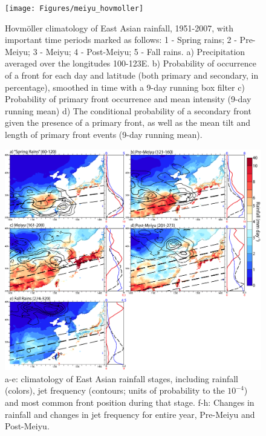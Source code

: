 \documentclass[draft,grl]{AGUTeX}
\begin{document}
\begin{figure}
\label{hov}
\noindent\texttt{[image: Figures/meiyu\_hovmoller]}
\caption{Hovm\"oller climatology of East Asian rainfall, 1951-2007, with important time periods marked as follows: 1 - Spring rains; 2 - Pre-Meiyu; 3 - Meiyu; 4 - Post-Meiyu; 5 - Fall rains. a) Precipitation averaged over the longitudes 100-123\textdegree E. b) Probability of occurrence of a front for each day and latitude (both primary and secondary, in percentage), smoothed in time with a 9-day running box filter c) Probability of primary front occurrence and mean intensity (9-day running mean) d) The conditional probability of a secondary front given the presence of a primary front, as well as the mean tilt and length of primary front events (9-day running mean).}
\end{figure}

\begin{figure}
\label{climo}
\noindent\includegraphics[width=36pc]{Figures/climo}
\caption{a-e: climatology of East Asian rainfall stages, including rainfall (colors), jet frequency (contours; units of probability to the $10^{-4}$) and most common front position during that stage. f-h: Changes in rainfall and changes in jet frequency for entire year, Pre-Meiyu and Post-Meiyu.}
\end{figure}
\end{document}
